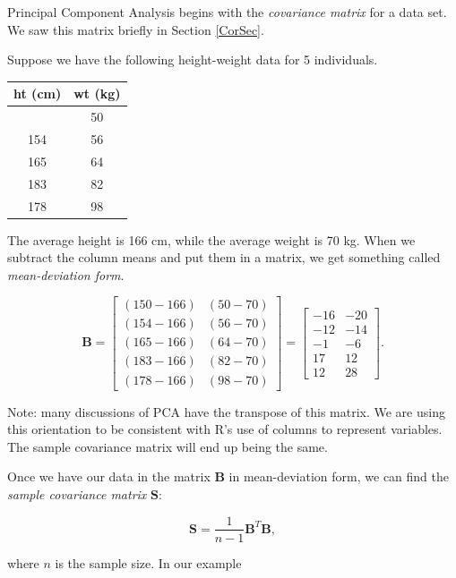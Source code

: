 \documentclass[
]{book}
\theoremstyle{definition}
\theoremstyle{definition}
\theoremstyle{definition}
\theoremstyle{definition}
\theoremstyle{remark}
\begin{document}
Principal Component Analysis begins with the \emph{covariance matrix} for a data set. We saw this matrix briefly in Section \ref{CorSec}.

Suppose we have the following height-weight data for 5 individuals.

\begin{longtable}[]{@{}cc@{}}
\toprule\noalign{}
ht (cm) & wt (kg) \\
\midrule\noalign{}
\endhead
\bottomrule\noalign{}
\endlastfoot
150 & 50 \\
154 & 56 \\
165 & 64 \\
183 & 82 \\
178 & 98 \\
\end{longtable}

The average height is 166 cm, while the average weight is 70 kg. When we subtract the column means and put them in a matrix, we get something called \emph{mean-deviation form}.

\[\mathbf{B}=\begin{bmatrix}(150-166) & (50-70)\\(154-166) & (56-70)\\(165-166) & (64-70)\\(183-166) & (82-70)\\(178-166) & (98-70)\end{bmatrix}=\left[\begin{array}{rr} -16 & -20\\-12 & -14\\-1 & -6\\ 17 & 12\\12 & 28\end{array}\right].\]

\begin{notebox}
Note: many discussions of PCA have the transpose of this matrix. We are using this orientation to be consistent with R's use of columns to represent variables. The sample covariance matrix will end up being the same.

\end{notebox}

Once we have our data in the matrix \(\mathbf{B}\) in mean-deviation form, we can find the \emph{sample covariance matrix} \(\mathbf{S}:\)

\[\mathbf{S}=\frac{1}{n-1}\mathbf{B}^T\mathbf{B},\]

where \(n\) is the sample size. In our example
\end{document}
